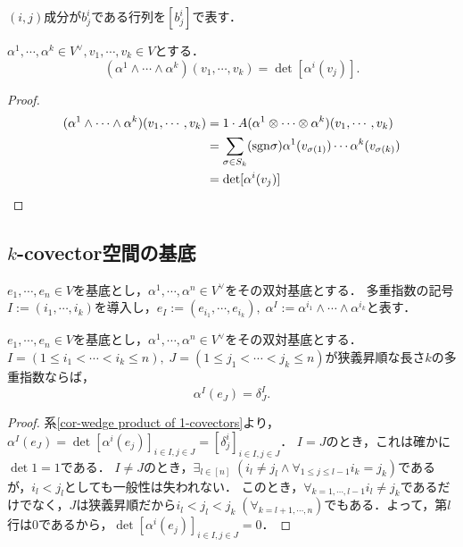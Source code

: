 \documentclass[uplatex,dvipdfmx]{jsreport}
\begin{document}
\begin{notation}
    $(i,j)$成分が$b^i_j$である行列を$[b^i_j]$で表す．
\end{notation}

\begin{corollary}\label{cor-wedge product of 1-covectors}
    $\alpha^1,\cdots,\alpha^k\in V^\vee,v_1,\cdots,v_k\in V$とする．
    \[(\alpha^1\wedge\cdots\wedge\alpha^k)(v_1,\cdots,v_k)=\det[\alpha^i(v_j)].\]
\end{corollary}
\begin{proof}
    \begin{align*}
        (\alpha^1\wedge\cdots\wedge\alpha^k)(v_1,\cdots,v_k)&=1\cdot A(\alpha^1\otimes\cdots\otimes\alpha^k)(v_1,\cdots,v_k)\\
        &=\sum_{\sigma\in S_k}(\mathrm{sgn}\sigma)\alpha^1(v_{\sigma(1)})\cdots\alpha^k(v_{\sigma(k)})\\
        &=\det[\alpha^i(v_j)]
    \end{align*}
\end{proof}

\subsection{$k$-covector空間の基底}

\begin{notation}
    $e_1,\cdots,e_n\in V$を基底とし，$\alpha^1,\cdots,\alpha^n\in V^\vee$をその双対基底とする．
    多重指数の記号$I:=(i_1,\cdots,i_k)$を導入し，$e_I:=(e_{i_1},\cdots,e_{i_k}),\;\alpha^I:=\alpha^{i_1}\wedge\cdots\wedge\alpha^{i_k}$と表す．
\end{notation}

\begin{lemma}[狭義昇順の多重指数で定まれば一致する]
    $e_1,\cdots,e_n\in V$を基底とし，$\alpha^1,\cdots,\alpha^n\in V^\vee$をその双対基底とする．
    $I=(1\le i_1<\cdots<i_k\le n),\;J=(1\le j_1<\cdots<j_k\le n)$が狭義昇順な長さ$k$の多重指数ならば，
    \[\alpha^I(e_J)=\delta^I_J.\]
\end{lemma}
\begin{proof}
    系\ref{cor-wedge product of 1-covectors}より，$\alpha^I(e_J)=\det[\alpha^i(e_j)]_{i\in I,j\in J}=[\delta^i_j]_{i\in I,j\in J}$．
    $I=J$のとき，これは確かに$\det 1=1$である．
    $I\ne J$のとき，$\exists_{l\in[n]}\;(i_l\ne j_l\land \forall_{1\le j\le l-1}i_k=j_k)$であるが，$i_l<j_l$としても一般性は失われない．
    このとき，$\forall_{k=1,\cdots,l-1}i_l\ne j_k$であるだけでなく，$J$は狭義昇順だから$i_l<j_l<j_k\;(\forall_{k=l+1,\cdots,n})$でもある．よって，第$l$行は$0$であるから，$\det[\alpha^i(e_j)]_{i\in I,j\in J}=0$．
\end{proof}
\end{document}
